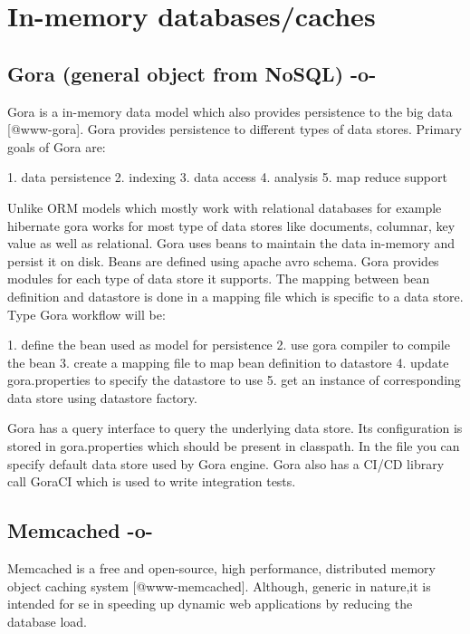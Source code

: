 \section{In-memory databases/caches}


\subsection{Gora (general object from NoSQL) -o-}

Gora is a in-memory data model which also provides persistence to the
big data [@www-gora].  Gora provides persistence to different
types of data stores. Primary goals of Gora are:

     1. data persistence
     2. indexing
     3. data access
     4. analysis
     5. map reduce support

Unlike ORM models which mostly work with relational databases for
example hibernate gora works for most type of data stores like
documents, columnar, key value as well as relational. Gora uses beans
to maintain the data in-memory and persist it on disk. Beans are
defined using apache avro schema. Gora provides modules for each type
of data store it supports.  The mapping between bean definition and
datastore is done in a mapping file which is specific to a data store.
Type Gora workflow will be:

     1. define  the bean used as model for persistence
     2. use gora compiler to compile the bean
     3. create a mapping file to map bean definition to datastore
     4. update gora.properties to specify the datastore to use
     5. get an instance of corresponding data store using datastore factory.

Gora has a query interface to query the underlying data store. Its
configuration is stored in gora.properties which should be present in
classpath. In the file you can specify default data store used by Gora
engine. Gora also has a CI/CD library call GoraCI which is used to
write integration tests.



\subsection{Memcached -o-}

Memcached is a free and open-source, high performance, distributed
memory object caching system [@www-memcached].  Although,
generic in nature,it is intended for se in speeding up dynamic web
applications by reducing the database load.

